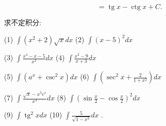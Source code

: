 \documentclass[lang=cn,newtx,12pt,scheme=chinese]{elegantbook}
\begin{document}
\[
= \operatorname{tg}x - \operatorname{ctg}x + C\text{. }
\]

\begin{problemset}[练习]

\item 求不定积分:

(1) \(\int \left( {{x}^{2} + 2}\right) \sqrt{x}{dx}\) (2) \(\int {\left( x - 5\right) }^{2}{dx}\)

(3) \(\int \frac{{x}^{4} - x - 5}{{x}^{2}}{dx}\) (4) \(\int \frac{{x}^{2} - 9}{x + 3}{dx}\)

(5) \(\int \left( {{a}^{x} + {\csc }^{2}x}\right) {dx}\) (6) \(\int \left( {{\sec }^{2}x + \frac{2}{1 + {x}^{2}}}\right) {dx}\)

(7) \(\int \frac{\sqrt{x} - {x}^{3}{e}^{x}}{{x}^{3}}{dx}\) (8) \(\int {\left( \sin \frac{x}{2} - \cos \frac{x}{2}\right) }^{2}{dx}\)

(9) \(\int {\operatorname{tg}}^{2}{xdx}\) (10) \(\int \frac{5}{\sqrt{1 - {x}^{2}}}{dx}\) .

\end{problemset}
\end{document}
